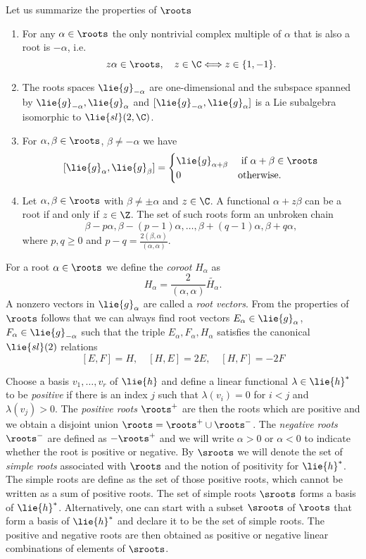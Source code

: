 Let us summarize the properties of $\roots$
\begin{enumerate}
 \item For any $\alpha \in \roots$ the only nontrivial complex multiple of $\alpha$ that is also a root is $-\alpha$, i.e.
	\[ z \alpha \in \roots, \quad z\in \C \Longleftrightarrow z \in \{ 1, -1 \}. \]
 \item The roots spaces $\lie{g}_{-\alpha}$ are one-dimensional and the subspace spanned by $\lie{g}_{-\alpha}, \lie{g}_\alpha$ and $[\lie{g}_{-\alpha}, \lie{g}_\alpha]$ is a Lie subalgebra isomorphic to $\lie{sl}(2,\C)$.
 \item For $\alpha, \beta \in \roots$, $\beta \neq -\alpha$ we have
 \[
  [\lie{g}_\alpha,\lie{g}_\beta] = \begin{cases}
				      \lie{g}_{\alpha + \beta} & \text{ if } \alpha + \beta \in \roots \\
				        0 & \text{otherwise}.
                                  \end{cases}
 \]
 \item Let $\alpha, \beta \in \roots$ with $\beta \neq \pm \alpha$ and $z\in\C$. A functional $\alpha + z\beta$ can be a root if and only if $z\in\Z$. The set of such roots form an unbroken chain
 \[ \beta - p\alpha, \beta -(p-1)\alpha, \ldots, \beta + (q-1)\alpha, \beta +q\alpha, \]
       where $p,q\geq 0$ and $p-q = \frac{2(\beta,\alpha)}{(\alpha,\alpha)}$. 
\end{enumerate}

For a root $\alpha \in \roots$ we define the \emph{coroot} $H_\alpha$ as
\[
 H_\alpha = \frac{2}{(\alpha,\alpha)}\widetilde{H_\alpha}.
\]
A nonzero vectors in $\lie{g}_\alpha$ are called a \emph{root vectors}. From the properties of $\roots$ follows that we can always find root vectors $E_\alpha \in \lie{g}_\alpha$, $F_\alpha \in \lie{g}_{-\alpha}$ such that the triple $E_\alpha, F_\alpha, H_\alpha$ satisfies the canonical $\lie{sl}(2)$ relations
\[
 [E,F] = H, \quad [H,E] = 2E, \quad [H,F] = -2F
\]

Choose a basis $v_1, \ldots, v_r$ of $\lie{h}$ and define a linear functional $\lambda\in\lie{h}^*$ to be \emph{positive} if there is an index $j$ such that $\lambda(v_i) = 0$ for $i<j$ and $\lambda(v_j) > 0$. The \emph{positive roots} $\roots^+$ are then the roots which are positive and we obtain a disjoint union $\roots = \roots^+ \cup \roots^-$. The \emph{negative roots}  $\roots^-$ are defined as $-\roots^+$ and we will write $\alpha > 0$ or $\alpha < 0$ to indicate whether the root is positive or negative. By $\sroots$ we will denote the set of \emph{simple roots} associated with $\roots$ and the notion of positivity for $\lie{h}^*$. The simple roots are define as the set of those positive roots, which cannot be written as a sum of positive roots. The set of simple roots $\sroots$ forms a basis of $\lie{h}^*$. Alternatively, one can start with a subset $\sroots$ of $\roots$ that form a basis of $\lie{h}^*$ and declare it to be the set of simple roots. The positive and negative roots are then obtained as 
positive or negative linear combinations of elements of $\sroots$.

